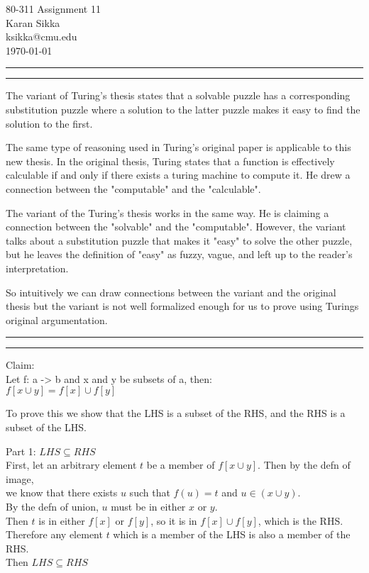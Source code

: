 \documentclass[11pt,letterpaper]{article}
\makeatletter
\newcommand{\question}[1] {\vspace{.25in} \hrule\vspace{0.5em}
\noindent{\bf #1} \vspace{0.5em}
\hrule \vspace{.10in}}
\newcommand{\myname}{Karan Sikka}
\newcommand{\myandrew}{ksikka@cmu.edu}
\newcommand{\myhwnum}{11}
\makeatother
\begin{document}
\medskip

\thispagestyle{plain}
\begin{center}                  %
{\Large 80-311 Assignment \myhwnum} \\
\myname \\
\myandrew \\
\today
\end{center}

\question{1}
The variant of Turing's thesis states that a solvable puzzle
has a corresponding substitution puzzle where a solution to the latter puzzle
makes it easy to find the solution to the first.

The same type of reasoning used in Turing's original paper is applicable to this new thesis.
In the original thesis, Turing states that a function is effectively calculable if and only if there
exists a turing machine to compute it. He drew a connection between the "computable" and the "calculable".

The variant of the Turing's thesis works in the same way. He is claiming a connection between the "solvable"
and the "computable". However, the variant talks about a substitution puzzle that makes it "easy" to solve the other puzzle,
but he leaves the definition of "easy" as fuzzy, vague, and left up to the reader's interpretation.

So intuitively we can draw connections between the variant and the original thesis but the variant is not well formalized enough for us
to prove using Turings original argumentation.

\question{2.i}
Claim:\\
Let f: a -> b and x and y be subsets of a, then:\\
$f[x \cup y] = f[x] \cup f[y]$

To prove this we show that the LHS is a subset of the RHS, and the RHS is a subset of the LHS.

Part 1: $LHS \subseteq RHS$\\
First, let an arbitrary element $t$ be a member of $f[x \cup y]$. Then by the defn of image,\\
we know that there exists $u$ such that $f(u) = t$ and $u \in (x \cup y)$.\\
By the defn of union, $u$ must be in either $x$ or $y$.\\
Then $t$ is in either $f[x]$ or $f[y]$, so it is in $f[x] \cup f[y]$, which is the RHS.\\
Therefore any element $t$ which is a member of the LHS is also a member of the RHS.\\
Then $LHS \subseteq RHS$
\end{document}

